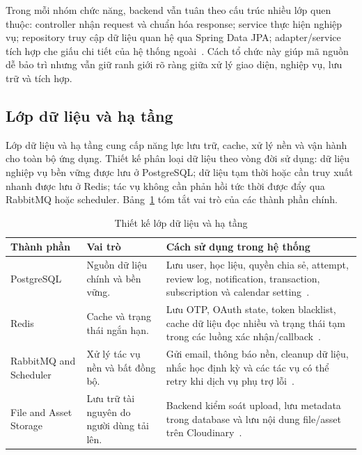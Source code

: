 Trong mỗi nhóm chức năng, backend vẫn tuân theo cấu trúc nhiều lớp quen thuộc: controller nhận request và chuẩn hóa response; service thực hiện nghiệp vụ; repository truy cập dữ liệu quan hệ qua Spring Data JPA; adapter/service tích hợp che giấu chi tiết của hệ thống ngoài~\cite{springdatajpa}. Cách tổ chức này giúp mã nguồn dễ bảo trì nhưng vẫn giữ ranh giới rõ ràng giữa xử lý giao diện, nghiệp vụ, lưu trữ và tích hợp.

\subsection{Lớp dữ liệu và hạ tầng}
\label{subsec:data-infrastructure-design}

Lớp dữ liệu và hạ tầng cung cấp năng lực lưu trữ, cache, xử lý nền và vận hành cho toàn bộ ứng dụng. Thiết kế phân loại dữ liệu theo vòng đời sử dụng: dữ liệu nghiệp vụ bền vững được lưu ở PostgreSQL; dữ liệu tạm thời hoặc cần truy xuất nhanh được lưu ở Redis; tác vụ không cần phản hồi tức thời được đẩy qua RabbitMQ hoặc scheduler. Bảng~\ref{tab:data-infrastructure-design} tóm tắt vai trò của các thành phần chính.

\begin{table}[htbp]
    \centering
    \small
    \caption{Thiết kế lớp dữ liệu và hạ tầng}
    \label{tab:data-infrastructure-design}
    \renewcommand{\arraystretch}{1.15}
    \begin{tabular}{|p{}|p{}|p{}|}
        \hline
        \textbf{Thành phần} & \textbf{Vai trò} & \textbf{Cách sử dụng trong hệ thống} \\
        \hline
        PostgreSQL & Nguồn dữ liệu chính và bền vững. & Lưu user, học liệu, quyền chia sẻ, attempt, review log, notification, transaction, subscription và calendar setting~\cite{postgresqlabout}. \\
        \hline
        Redis & Cache và trạng thái ngắn hạn. & Lưu OTP, OAuth state, token blacklist, cache dữ liệu đọc nhiều và trạng thái tạm trong các luồng xác nhận/callback~\cite{redisoverview}. \\
        \hline
        RabbitMQ and Scheduler & Xử lý tác vụ nền và bất đồng bộ. & Gửi email, thông báo nền, cleanup dữ liệu, nhắc học định kỳ và các tác vụ có thể retry khi dịch vụ phụ trợ lỗi~\cite{rabbitmqtutorials}. \\
        \hline
        File and Asset Storage & Lưu trữ tài nguyên do người dùng tải lên. & Backend kiểm soát upload, lưu metadata trong database và lưu nội dung file/asset trên Cloudinary~\cite{cloudinaryjava}. \\
        \hline
    \end{tabular}
\end{table}


